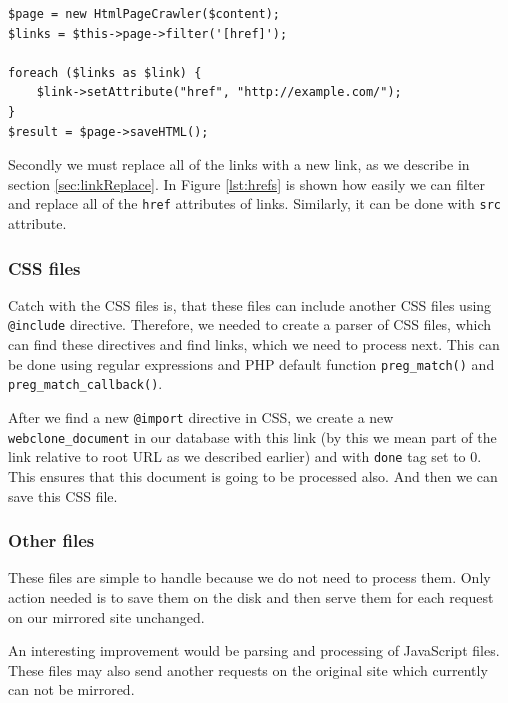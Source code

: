 \begin{lstlisting}[caption={Example of finding and replacing href attributes in an HTML document},label={lst:hrefs}]
$page = new HtmlPageCrawler($content);
$links = $this->page->filter('[href]');

foreach ($links as $link) {
	$link->setAttribute("href", "http://example.com/");
}
$result = $page->saveHTML();
\end{lstlisting}

Secondly we must replace all of the links with a new link, as we describe in section \ref{sec:linkReplace}. In Figure \ref{lst:hrefs} is shown how easily we can filter and replace all of the \texttt{href} attributes of links. Similarly, it can be done with \texttt{src} attribute.

\subsubsection{CSS files}
Catch with the CSS files is, that these files can include another CSS files using \texttt{@include} directive. Therefore, we needed to create a parser of CSS files, which can find these directives and find links, which we need to process next. This can be done using regular expressions and PHP default function \texttt{preg\_match()} and \texttt{preg\_match\_callback()}.

After we find a new \texttt{@import} directive in CSS, we create a new \texttt{webclone\_document} in our database with this link (by this we mean part of the link relative to root URL as we described earlier) and with \texttt{done} tag set to 0. This ensures that this document is going to be processed also. And then we can save this CSS file.

\subsubsection{Other files}
These files are simple to handle because we do not need to process them. Only action needed is to save them on the disk and then serve them for each request on our mirrored site unchanged.

An interesting improvement would be parsing and processing of JavaScript files. These files may also send another requests on the original site which currently can not be mirrored.


